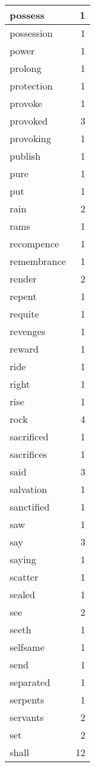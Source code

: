\begin{center}
\begin{longtable}{l|r}
possess & 1 \\ \hline
possession & 1 \\ \hline
power & 1 \\ \hline
prolong & 1 \\ \hline
protection & 1 \\ \hline
provoke & 1 \\ \hline
provoked & 3 \\ \hline
provoking & 1 \\ \hline
publish & 1 \\ \hline
pure & 1 \\ \hline
put & 1 \\ \hline
rain & 2 \\ \hline
rams & 1 \\ \hline
recompence & 1 \\ \hline
remembrance & 1 \\ \hline
render & 2 \\ \hline
repent & 1 \\ \hline
requite & 1 \\ \hline
revenges & 1 \\ \hline
reward & 1 \\ \hline
ride & 1 \\ \hline
right & 1 \\ \hline
rise & 1 \\ \hline
rock & 4 \\ \hline
sacrificed & 1 \\ \hline
sacrifices & 1 \\ \hline
said & 3 \\ \hline
salvation & 1 \\ \hline
sanctified & 1 \\ \hline
saw & 1 \\ \hline
say & 3 \\ \hline
saying & 1 \\ \hline
scatter & 1 \\ \hline
sealed & 1 \\ \hline
see & 2 \\ \hline
seeth & 1 \\ \hline
selfsame & 1 \\ \hline
send & 1 \\ \hline
separated & 1 \\ \hline
serpents & 1 \\ \hline
servants & 2 \\ \hline
set & 2 \\ \hline
shall & 12 \\ \hline

\end{longtable}
\end{center}

